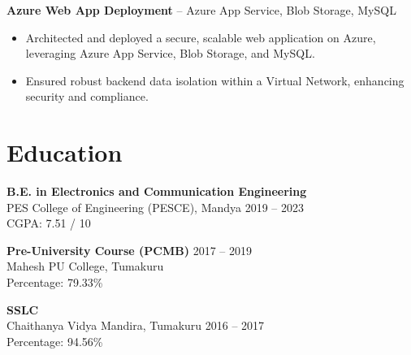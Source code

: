 \documentclass[a4paper,10pt]{article}
\begin{document}
\textbf{Azure Web App Deployment} – Azure App Service, Blob Storage, MySQL
\begin{itemize}[leftmargin=0.25in, label=\textbullet]
    \item Architected and deployed a secure, scalable web application on Azure, leveraging Azure App Service, Blob Storage, and MySQL.
    \item Ensured robust backend data isolation within a Virtual Network, enhancing security and compliance.
\end{itemize}

\section*{Education}
\textbf{B.E. in Electronics and Communication Engineering} \\
PES College of Engineering (PESCE), Mandya \hfill 2019 – 2023 \\
CGPA: 7.51 / 10

\textbf{Pre-University Course (PCMB)} \hfill 2017 – 2019 \\
Mahesh PU College, Tumakuru \\
Percentage: 79.33\%

\textbf{SSLC} \\
Chaithanya Vidya Mandira, Tumakuru \hfill 2016 – 2017 \\
Percentage: 94.56\%
\end{document}

